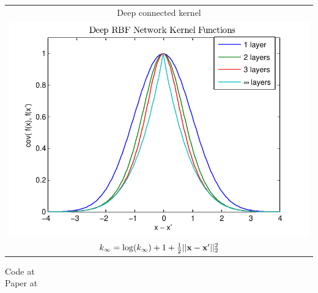 \documentclass[portrait,a0b,final,a4resizeable]{include/a0poster}
\begin{document}
\begin{poster}
\begin{multicols}{2}
\begin{minipage}[c]{0.6\columnwidth}
\begin{itemize}

\end{itemize}
\end{minipage}
\begin{minipage}[c]{0.39\columnwidth}
\begin{centering}
\begin{tabular}{c}
Deep connected kernel \\
\hspace{-0.5cm}\includegraphics[width=\columnwidth, clip, trim = 0cm 0.4cm 0.9cm 0.3cm]{../figures/deep_kernel_connected}
 \\
$k_\infty = \log(k_\infty) + 1 + \frac{1}{2} || \mathbf{x} - \mathbf{x}' ||_2^2$
\end{tabular}
\end{centering}
\end{minipage}

Code at {}\\
Paper at {}

\end{multicols}
\end{poster}
\end{document}
